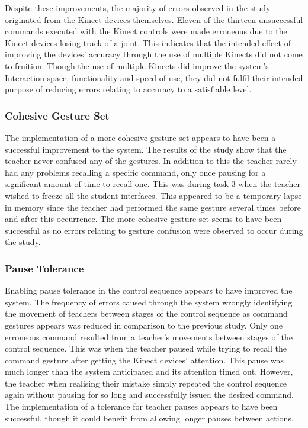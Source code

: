\documentclass[link]{IWCOMP}
\begin{document}
Despite these improvements, the majority of errors observed in the study originated from the Kinect devices themselves.
Eleven of the thirteen unsuccessful commands executed with the Kinect controls were made erroneous due to the Kinect devices losing track of a joint.
This indicates that the intended effect of improving the devices' accuracy through the use of multiple Kinects did not come to fruition.
Though the use of multiple Kinects did improve the system's Interaction space, functionality and speed of use, they did not fulfil their intended purpose of reducing errors relating to accuracy to a satisfiable level.

\subsubsection{Cohesive Gesture Set}
\label{sec:discussionSuccessCohesiveGestureSet}

The implementation of a more cohesive gesture set appears to have been a successful improvement to the system.
The results of the study show that the teacher never confused any of the gestures.
In addition to this the teacher rarely had any problems recalling a specific command, only once pausing for a significant amount of time to recall one.
This was during task 3 when the teacher wished to freeze all the student interfaces.
This appeared to be a temporary lapse in memory since the teacher had performed the same gesture several times before and after this occurrence.
The more cohesive gesture set seems to have been successful as no errors relating to gesture confusion were observed to occur during the study.

\subsubsection{Pause Tolerance}
\label{sec:discussionSuccessPauseTolerance}

Enabling pause tolerance in the control sequence appears to have improved the system.
The frequency of errors caused through the system wrongly identifying the movement of teachers between stages of the control sequence as command gestures appears was reduced in comparison to the previous study.
Only one erroneous command resulted from a teacher's movements between stages of the control sequence.
This was when the teacher paused while trying to recall the command gesture after getting the Kinect devices' attention.
This pause was much longer than the system anticipated and its attention timed out.
However, the teacher when realising their mistake simply repeated the control sequence again without pausing for so long and successfully issued the desired command.
The implementation of a tolerance for teacher pauses appears to have been successful, though it could benefit from allowing longer pauses between actions.
\end{document}
